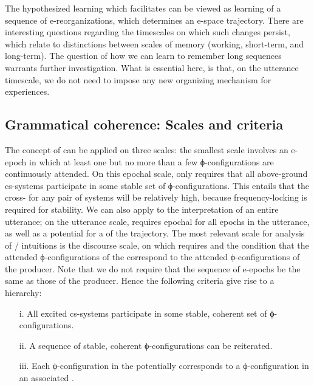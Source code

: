   The hypothesized learning which  facilitates can be viewed as learning of a sequence of e-reorganizations, which determines an e-space trajectory. There are interesting questions regarding the timescales on which such changes persist, which relate to distinctions between scales of memory (working, short-term, and long-term). The question of how we can learn to remember long sequences warrants further investigation. What is essential here, is that, on the utterance timescale, we do not need to impose any new organizing mechanism for  experiences. 

\subsection{Grammatical coherence: Scales and criteria}

The concept of  can be applied on three scales: the smallest scale involves an e-epoch in which at least one but no more than a few ϕ-con\-fi\-gu\-ra\-tions are continuously attended. On this epochal scale,  only requires that all above-ground cs-sys\-tems participate in some stable set of ϕ-con\-fi\-gu\-ra\-tions. This entails that the cross- for any pair of systems will be relatively high, because frequency-locking is required for stability. We can also apply  to the interpretation of an entire utterance; on the utterance scale,  requires epochal  for all epochs in the utterance, as well as a potential for a  of the trajectory. The most relevant scale for analysis of / intuitions is the discourse scale, on which  requires  and the condition that the attended ϕ-con\-fi\-gu\-ra\-tions of the  correspond to the attended ϕ-con\-fi\-gu\-ra\-tions of the producer. Note that we do not require that the sequence of  e-epochs be the same as those of the producer. Hence the following criteria give rise to a  hierarchy:

\begin{itemize}
\item[i.] 
All excited cs-sys\-tems participate in some stable, coherent set of ϕ-con\-fi\-gu\-ra\-tions.
\item[ii.] 
A sequence of stable, coherent ϕ-con\-fi\-gu\-ra\-tions can be reiterated.
\item[iii.] 
Each ϕ-con\-fi\-gu\-ra\-tion in the potentially   corresponds to a ϕ-con\-fi\-gu\-ra\-tion in an associated .
\end{itemize}

